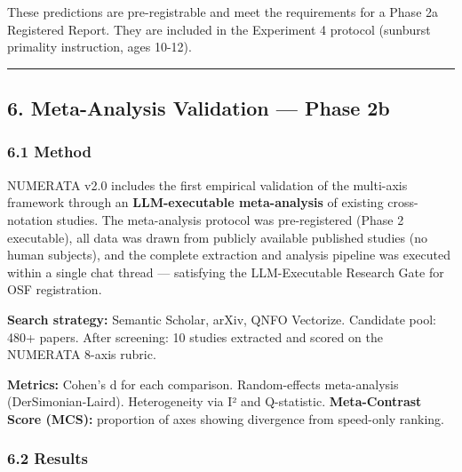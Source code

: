 \documentclass[
]{article}
\begin{document}
These predictions are pre-registrable and meet the requirements for a
Phase 2a Registered Report. They are included in the Experiment 4
protocol (sunburst primality instruction, ages 10-12).

\begin{center}\rule{0.5\linewidth}{0.5pt}\end{center}

\subsection{6. Meta-Analysis Validation --- Phase
2b}\label{meta-analysis-validation-phase-2b}

\subsubsection{6.1 Method}\label{method}

NUMERATA v2.0 includes the first empirical validation of the multi-axis
framework through an \textbf{LLM-executable meta-analysis} of existing
cross-notation studies. The meta-analysis protocol was pre-registered
(Phase 2 executable), all data was drawn from publicly available
published studies (no human subjects), and the complete extraction and
analysis pipeline was executed within a single chat thread ---
satisfying the LLM-Executable Research Gate for OSF registration.

\textbf{Search strategy:} Semantic Scholar, arXiv, QNFO Vectorize.
Candidate pool: 480+ papers. After screening: 10 studies extracted and
scored on the NUMERATA 8-axis rubric.

\textbf{Metrics:} Cohen's d for each comparison. Random-effects
meta-analysis (DerSimonian-Laird). Heterogeneity via I² and Q-statistic.
\textbf{Meta-Contrast Score (MCS):} proportion of axes showing
divergence from speed-only ranking.

\subsubsection{6.2 Results}\label{results}
\end{document}
